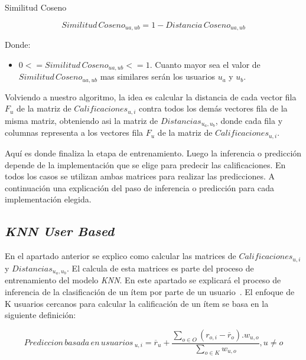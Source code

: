 \documentclass[11pt,a4paper,twoside]{thesis}
\begin{document}
\clearpage
\begin{description}
	\item[Similitud Coseno]
\end{description}
\begin{equation}
	Similitud \mspace{3mu}Coseno_{ua, ub} = 1- Distancia \mspace{3mu}Coseno_{ua, ub}
\end{equation}
\begin{description}
	\item[Donde:]
\end{description}
\begin{itemize}
	\item $0 <= Similitud \mspace{3mu}Coseno_{ua, ub} <= 1$. Cuanto mayor sea el valor de $Similitud \mspace{3mu}Coseno_{ua, ub}$ mas similares serán los usuarios $u_a$ y $u_b$.
\end{itemize}

Volviendo a nuestro algoritmo, la idea es calcular la distancia de cada vector
fila $F_u$ de la matriz de $Calificaciones_{u,i}$ contra todos los demás
vectores fila de la misma matriz, obteniendo asi la matriz de
$Distancias_{u_a,u_b}$, donde cada fila y columnas representa a los vectores
fila $F_u$ de la matriz de $Calificaciones_{u,i}$.

Aquí es donde finaliza la etapa de entrenamiento. Luego la inferencia o
predicción depende de la implementación que se elige para predecir las
calificaciones. En todos los casos se utilizan ambas matrices para realizar las
predicciones. A continuación una explicación del paso de inferencia o
predicción para cada implementación elegida.

\clearpage

\subsection{\textit{KNN User Based}}

En el apartado anterior se explico como calcular las matrices de
$Calificaciones_{u,i}$ y $Distancias_{u_a,u_b}$. El calcula de esta matrices es
parte del proceso de entrenamiento del modelo \textit{KNN}. En este apartado se
explicará el proceso de inferencia de la clasificación de un ítem por parte de
un usuario~\cite{useritembasedinference}. El enfoque de K usuarios cercanos
para calcular la calificación de un ítem se basa en la siguiente definición:

\begin{equation}
	Prediccion \mspace{3mu}basada \mspace{3mu}en \mspace{3mu}usuarios\mspace{3mu}_{u, i} = \overline{r}_{u} + \frac{\sum_{o \in O} (r_{o, i} - \overline{r}_o) . w_{u, o} }{ \sum_{o \in K} w_{u, o}}, u \neq o
\end{equation}
\end{document}
